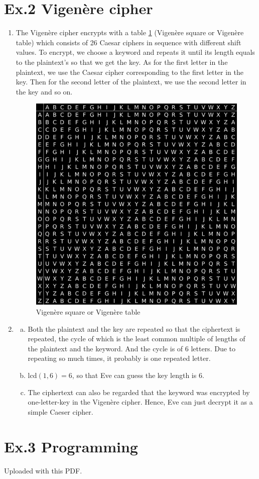 \documentclass[a4paper]{article}
\begin{document}
\section*{Ex.2 Vigenère cipher}
\begin{enumerate}
	\item The Vigenère cipher encrypts with a table \ref{fig:vigeneretable} (Vigenère square or Vigenère table) which consists of 26 Caesar ciphers in sequence with different shift values. To encrypt, we choose a keyword and repeats it until its length equals to the plaintext's so that we get the key. As for the first letter in the plaintext, we use the Caesar cipher corresponding to the first letter in the key. Then for the second letter of the plaintext, we use the second letter in the key and so on.
	\begin{figure}[!htb]
	\centering
	\includegraphics[scale=0.3]{vigeneretable.png}
	\caption{Vigenère square or Vigenère table}
	\label{fig:vigeneretable}
\end{figure}
	\item
	\begin{enumerate}[a)]
		\item Both the plaintext and the key are repeated so that the ciphertext is repeated, the cycle of which is the least common multiple of lengths of the plaintext and the keyword. And the cycle is of 6 letters. Due to repeating so much times, it probably is one repeated letter.
		\item lcd$(1, 6) = 6$, so that Eve can guess the key length is 6.
		\item The ciphertext can also be regarded that the keyword was encrypted by one-letter-key in the Vigenère cipher. Hence, Eve can just decrypt it as a simple Caeser cipher.
	\end{enumerate}
\end{enumerate}

\section*{Ex.3 Programming}
	Uploaded with this PDF.
\end{document}
